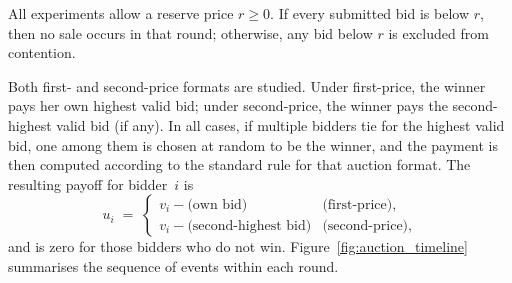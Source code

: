 All experiments allow a reserve price $r\ge 0$. If every submitted bid is below $r$, then no sale occurs in that round; otherwise, any bid below $r$ is excluded from contention.


Both first- and second-price formats are studied. Under first-price, the winner pays her own highest valid bid; under second-price, the winner pays the second-highest valid bid (if any). In all cases, if multiple bidders tie for the highest valid bid, one among them is chosen at random to be the winner, and the payment is then computed according to the standard rule for that auction format. The resulting payoff for bidder~$i$ is
\[
u_{i} \;=\;
\begin{cases}
v_{i} - \text{(own bid)} & \text{(first-price),}\\
v_{i} - \text{(second-highest bid)} & \text{(second-price),}
\end{cases}
\]
and is zero for those bidders who do not win. Figure~\ref{fig:auction_timeline} summarises the sequence of events within each round.

